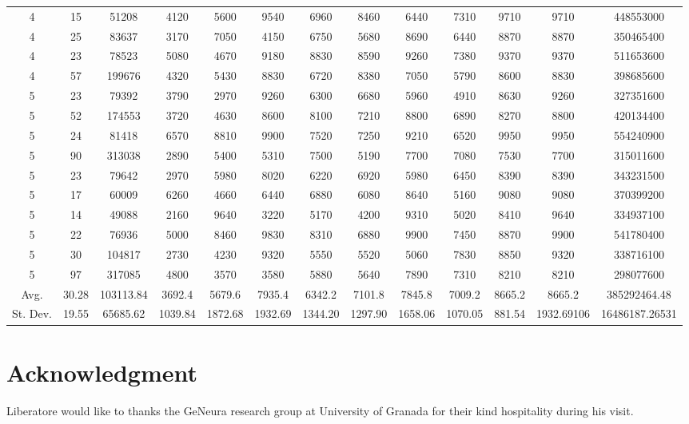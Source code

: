 \documentclass[journal]{IEEEtran}
\begin{document}
\begin{table}
\begin{tabular}{|ccc|cccccccc|cc|}
4	&	15	&	51208	&	4120	&	5600	&	9540	&	6960	&	8460	&	6440	&	7310	&	9710	&	9710	&	448553000	\\
4	&	25	&	83637	&	3170	&	7050	&	4150	&	6750	&	5680	&	8690	&	6440	&	8870	&	8870	&	350465400	\\
4	&	23	&	78523	&	5080	&	4670	&	9180	&	8830	&	8590	&	9260	&	7380	&	9370	&	9370	&	511653600	\\
4	&	57	&	199676	&	4320	&	5430	&	8830	&	6720	&	8380	&	7050	&	5790	&	8600	&	8830	&	398685600	\\
\hline																				
5	&	23	&	79392	&	3790	&	2970	&	9260	&	6300	&	6680	&	5960	&	4910	&	8630	&	9260	&	327351600	\\
5	&	52	&	174553	&	3720	&	4630	&	8600	&	8100	&	7210	&	8800	&	6890	&	8270	&	8800	&	420134400	\\
5	&	24	&	81418	&	6570	&	8810	&	9900	&	7520	&	7250	&	9210	&	6520	&	9950	&	9950	&	554240900	\\
5	&	90	&	313038	&	2890	&	5400	&	5310	&	7500	&	5190	&	7700	&	7080	&	7530	&	7700	&	315011600	\\
5	&	23	&	79642	&	2970	&	5980	&	8020	&	6220	&	6920	&	5980	&	6450	&	8390	&	8390	&	343231500	\\
5	&	17	&	60009	&	6260	&	4660	&	6440	&	6880	&	6080	&	8640	&	5160	&	9080	&	9080	&	370399200	\\
5	&	14	&	49088	&	2160	&	9640	&	3220	&	5170	&	4200	&	9310	&	5020	&	8410	&	9640	&	334937100	\\
5	&	22	&	76936	&	5000	&	8460	&	9830	&	8310	&	6880	&	9900	&	7450	&	8870	&	9900	&	541780400	\\
5	&	30	&	104817	&	2730	&	4230	&	9320	&	5550	&	5520	&	5060	&	7830	&	8850	&	9320	&	338716100	\\
5	&	97	&	317085	&	4800	&	3570	&	3580	&	5880	&	5640	&	7890	&	7310	&	8210	&	8210	&	298077600	\\
\hline																				
Avg.	&	30.28	&	103113.84	&	3692.4	&	5679.6	&	7935.4	&	6342.2	&	7101.8	&	7845.8	&	7009.2	&	8665.2	&	8665.2	&	385292464.48	\\
St. Dev.	&	19.55	&	65685.62	&	1039.84	&	1872.68	&	1932.69	&	1344.20	&	1297.90	&	1658.06	&	1070.05	&	881.54	&	1932.69106	&	16486187.26531	\\
\hline																				
\end{tabular}
\end{table}

\section*{Acknowledgment}
Liberatore would like to thanks the GeNeura research group at
University of Granada for their kind hospitality during his visit.
\end{document}

